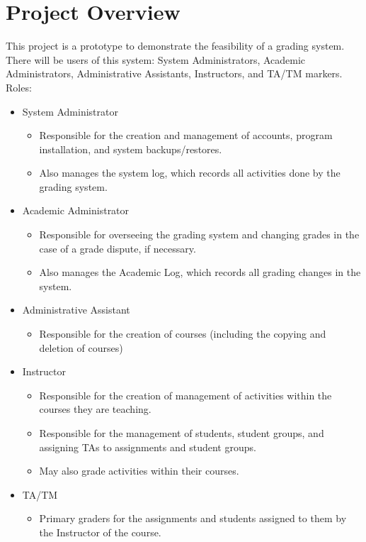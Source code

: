 \documentclass{article}
\begin{document}
\section{Project Overview}
This project is a prototype to demonstrate the feasibility of a grading system.
There will be users of this system: System Administrators, Academic Administrators,
Administrative Assistants, Instructors,  and TA/TM markers.\\
Roles:
\begin{itemize}
  \item System Administrator
   \begin{itemize}
     \item Responsible for the creation and management of accounts, program
       installation, and system backups/restores.
     \item Also manages the system log, which records all activities done by the
       grading system.
   \end{itemize}
   \item Academic Administrator
     \begin{itemize}
       \item Responsible for overseeing the grading system and changing grades
         in the case of a grade dispute, if necessary.
       \item Also manages the Academic Log, which records all grading changes
         in the system.
     \end{itemize}
   \item Administrative Assistant
     \begin{itemize}
       \item Responsible for the creation of courses (including the copying
         and deletion of courses)
     \end{itemize}
   \item Instructor
     \begin{itemize}
       \item Responsible for the creation of management of activities within
         the courses they are teaching.
       \item Responsible for the management of students, student groups, and
         assigning TAs to assignments and student groups.
       \item May also grade activities within their courses.
     \end{itemize}
   \item TA/TM
     \begin{itemize}
       \item Primary graders for the assignments and students assigned to them
         by the Instructor of the course.
     \end{itemize}
\end{itemize}
\end{document}
